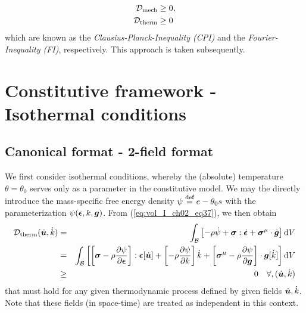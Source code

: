\begin{subequations}
\label{eq:vol_I_ch02_eq38}
\begin{align}
  \mathcal{D}_{\mathrm{mech}} & \geq 0,
\label{eq:vol_I_ch02_eq38a} \\
  \mathcal{D}_{\mathrm{therm}} & \geq 0
 \label{eq:vol_I_ch02_eq38b}
\end{align}
\end{subequations}
which are known as the {\em Clausius-Planck-Inequality (CPI)} and the 
{\em Fourier-Inequality (FI)}, respectively. This approach is taken subsequently.

\section{Constitutive framework - Isothermal conditions}

\subsection{Canonical format - 2-field format}

We first consider isothermal conditions, whereby the (absolute) temperature
$\theta=\theta_0$ serves only as a parameter in the constitutive model. 
We may the directly introduce the mass-specific free energy density 
$\psi\stackrel{\text{def}}{=} e-\theta_0 s$ with the parameterization $\psi(\bm{\epsilon}, k,\bm {g})$.
From (\ref{eq:vol_I_ch02_eq37}), we then obtain
\begin{eqnarray}
    \mathcal{D}_{\mathrm{therm}}(\dot{\bm {u}}, \dot{k})
    &=& \int_{\mathcal{B}}  \left[-\rho \dot{\psi} + \bm{\sigma} : \dot{\bm{\epsilon}} + 
    \bm{\sigma}^{\mathrm{\mu}} \cdot \dot{\bm {g}} \right] \mathop{}\!\mathrm{d} V \nonumber \\
    &=&
    \int_{\mathcal{B}}  \left[ \left[\bm{\sigma} -\rho \frac{\partial \psi}{\partial \bm{\epsilon}} \right] : \bm{\epsilon} [\dot{\bm {u}}] +
                  \left[-\rho \frac{\partial \psi}{\partial k} \right] \dot{k} +
                  \left[\bm{\sigma}^{\mathrm{\mu}} - \rho \frac{\partial \psi}{\partial \bm {g}} \right] \cdot \bm {g}[\dot{k}] 
            \right] \mathop{}\!\mathrm{d} V
    \nonumber \\
    &\geq& 0
    \quad \forall , (\dot{\bm {u}} ,\dot{k})
\label{eq:8-1}
\end{eqnarray}
that must hold for any given thermodynamic process defined by given fields 
$\dot{\bm {u}},\dot{k}$. Note that these fields (in space-time) are treated as 
independent in this context.

